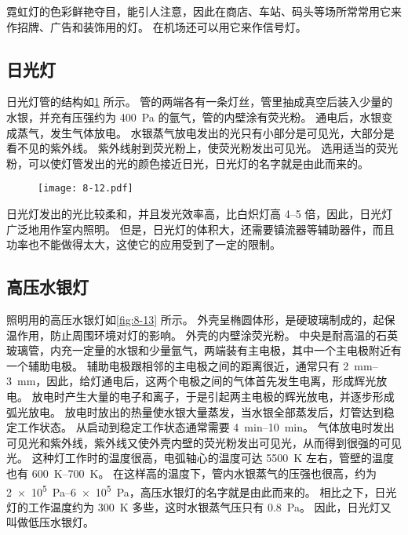 霓虹灯的色彩鲜艳夺目，能引人注意，因此在商店、车站、码头等场所常常用它来作招牌、广告和装饰用的灯。
在机场还可以用它来作信号灯。

\subsection{日光灯}
日光灯管的结构如\cref{fig:8-12} 所示。
管的两端各有一条灯丝，管里抽成真空后装入少量的水银，并充有压强约为 \qty{400}{Pa} 的氩气，管的内壁涂有荧光粉。
通电后，水银变成蒸气，发生气体放电。
水银蒸气放电发出的光只有小部分是可见光，大部分是看不见的紫外线。
紫外线射到荧光粉上，使荧光粉发出可见光。
选用适当的荧光粉，可以使灯管发出的光的颜色接近日光，日光灯的名字就是由此而来的。
\begin{figure}
  \texttt{[image: 8-12.pdf]}
  \caption{}\label{fig:8-12}
\end{figure}

日光灯发出的光比较柔和，并且发光效率高，比白炽灯高 \numrange{4}{5} 倍，因此，日光灯广泛地用作室内照明。
但是，日光灯的体积大，还需要镇流器等辅助器件，而且功率也不能做得太大，这使它的应用受到了一定的限制。

\subsection{高压水银灯}
照明用的高压水银灯如\cref{fig:8-13} 所示。
外壳呈椭圆体形，是硬玻璃制成的，起保温作用，防止周围环境对灯的影响。
外壳的内壁涂荧光粉。
中央是耐高温的石英玻璃管，内充一定量的水银和少量氩气，两端装有主电极，其中一个主电极附近有一个辅助电极。
辅助电极跟相邻的主电极之间的距离很近，通常只有 \qtyrange{2}{3}{mm}，因此，给灯通电后，这两个电极之间的气体首先发生电离，形成辉光放电。
放电时产生大量的电子和离子，于是引起两主电极的辉光放电，并逐步形成弧光放电。
放电时放出的热量使水银大量蒸发，当水银全部蒸发后，灯管达到稳定工作状态。
从启动到稳定工作状态通常需要 \qtyrange{4}{10}{min}。
气体放电时发出可见光和紫外线，紫外线又使外壳内壁的荧光粉发出可见光，从而得到很强的可见光。
这种灯工作时的温度很高，电弧轴心的温度可达 \qty{5500}{K} 左右，管壁的温度也有 \qtyrange{600}{700}{K}。
在这样高的温度下，管内水银蒸气的压强也很高，约为 \qtyrange{2e5}{6e5}{Pa}，高压水银灯的名字就是由此而来的。
相比之下，日光灯的工作温度约为 \qty{300}{K} 多些，这时水银蒸气压只有 \qty{0.8}{Pa}。
因此，日光灯又叫做低压水银灯。

